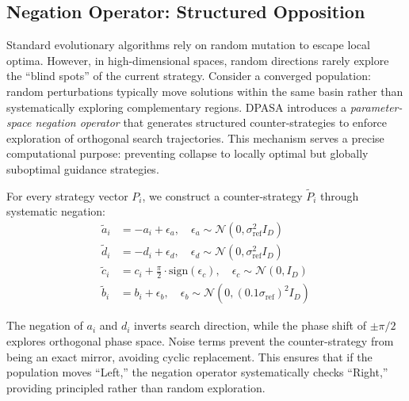 \documentclass[11pt]{article}
\begin{document}
\subsection{Negation Operator: Structured Opposition}


Standard evolutionary algorithms rely on random mutation to escape local optima. However, in high-dimensional spaces, random directions rarely explore the ``blind spots'' of the current strategy. Consider a converged population: random perturbations typically move solutions within the same basin rather than systematically exploring complementary regions. DPASA introduces a \textit{parameter-space negation operator} that generates structured counter-strategies to enforce exploration of orthogonal search trajectories. This mechanism serves a precise computational purpose: preventing collapse to locally optimal but globally suboptimal guidance strategies.

For every strategy vector $P_i$, we construct a counter-strategy $\tilde{P}_i$ through systematic negation:
\begin{align}
\tilde{a}_i &= -a_i + \epsilon_a, \quad \epsilon_a \sim \mathcal{N}(0, \sigma_{\text{ref}}^2 I_D) \label{eq:counter_a} \\
\tilde{d}_i &= -d_i + \epsilon_d, \quad \epsilon_d \sim \mathcal{N}(0, \sigma_{\text{ref}}^2 I_D) \label{eq:counter_d} \\
\tilde{c}_i &= c_i + \frac{\pi}{2} \cdot \text{sign}(\epsilon_c), \quad \epsilon_c \sim \mathcal{N}(0, I_D) \label{eq:counter_c} \\
\tilde{b}_i &= b_i + \epsilon_b, \quad \epsilon_b \sim \mathcal{N}(0, (0.1 \sigma_{\text{ref}})^2 I_D) \label{eq:counter_b}
\end{align}

The negation of $a_i$ and $d_i$ inverts search direction, while the phase shift of $\pm\pi/2$ explores orthogonal phase space. Noise terms prevent the counter-strategy from being an exact mirror, avoiding cyclic replacement. This ensures that if the population moves ``Left,'' the negation operator systematically checks ``Right,'' providing principled rather than random exploration.
\end{document}
